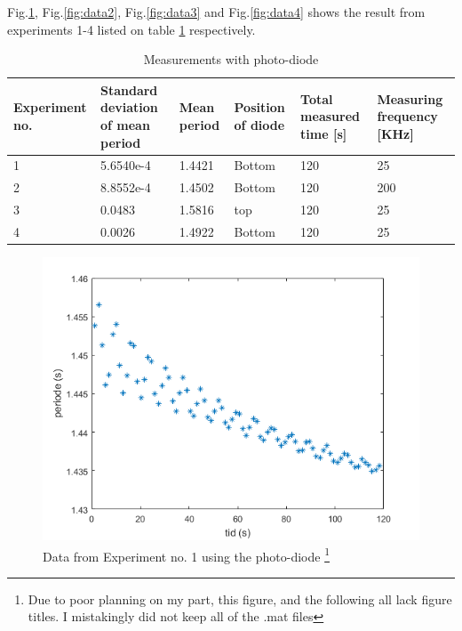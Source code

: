 \documentclass[%
 reprint,
 amsmath,amssymb,
 aps,
]{revtex4-1}
\begin{document}
        Fig.\ref{fig:data1}, Fig.\ref{fig:data2}, Fig.\ref{fig:data3} and Fig.\ref{fig:data4} shows the result from experiments 1-4 listed on table \ref{tab:photodiode} respectively.

        \begin{table}[h] %
            \caption{Measurements with photo-diode}
            \label{tab:photodiode}
            \begin{tabular}{| p{1.6cm} | p{1.4cm} | p{1.1cm} | p{1.3cm} | p{1.3cm} | p{1.5cm} |}
                \hline
                Experiment no. & Standard deviation of mean period & Mean period & Position of diode & Total measured time [s] & Measuring frequency [KHz] \\ \hline
                1 & 5.6540e-4 & 1.4421 & Bottom & 120 & 25 \\ \hline
                2 & 8.8552e-4 & 1.4502 & Bottom & 120 & 200 \\ \hline
                3 & 0.0483 & 1.5816 & top & 120 & 25 \\ \hline
                4 & 0.0026 & 1.4922 & Bottom & 120 & 25 \\ \hline
            \end{tabular}
        \end{table}
        
        \begin{figure}[h!]
        	\center
        	\includegraphics[scale=0.6]{forsok1fig1}
        	\caption{Data from Experiment no. 1 using the photo-diode
        	\footnote{Due to poor planning on my part, this figure, and the following all lack figure titles. I mistakingly did not keep all of the .mat files
        	}}
            \label{fig:data1}
        \end{figure}
\end{document}
